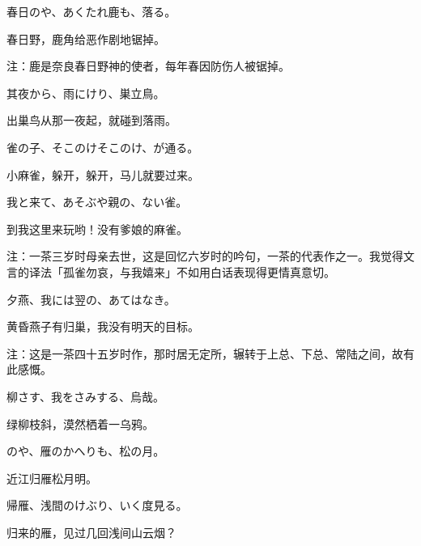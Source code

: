 \begin{haiku}
    {\FH 春日のや、あくたれ鹿も、落る。}

    {\FK 春日野，鹿角给恶作剧地锯掉。}

    {\FT 注：鹿是奈良春日野神的使者，每年春因防伤人被锯掉。}
\end{haiku}

\begin{haiku}
    {\FH 其夜から、雨にけり、巣立鳥。}

    {\FK 出巢鸟从那一夜起，就碰到落雨。}
\end{haiku}

\begin{haiku}
    {\FH 雀の子、そこのけそこのけ、が通る。}

    {\FK 小麻雀，躲开，躲开，马儿就要过来。}
\end{haiku}

\begin{haiku}
    {\FH 我と来て、あそぶや親の、ない雀。}

    {\FK 到我这里来玩哟！没有爹娘的麻雀。}

    {\FT 注：一茶三岁时母亲去世，这是回忆六岁时的吟句，一茶的代表作之一。我觉得文言的译法「孤雀勿哀，与我嬉来」不如用白话表现得更情真意切。}
\end{haiku}

\begin{haiku}
    {\FH 夕燕、我には翌の、あてはなき。}

    {\FK 黄昏燕子有归巢，我没有明天的目标。}

    {\FT 注：这是一茶四十五岁时作，那时居无定所，辗转于上总、下总、常陆之间，故有此感慨。}
\end{haiku}

\begin{haiku}
    {\FH 柳さす、我をさみする、烏哉。}

    {\FK 绿柳枝斜，漠然栖着一乌鸦。}
\end{haiku}

\begin{haiku}
    {\FH {}のや、雁のかへりも、松の月。}

    {\FK 近江归雁松月明。}
\end{haiku}

\begin{haiku}
    {\FH 帰雁、浅間のけぶり、いく度見る。}

    {\FK 归来的雁，见过几回浅间山云烟？}
\end{haiku}

